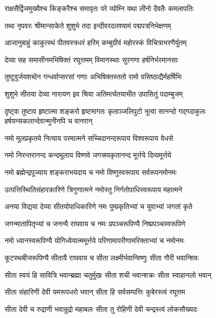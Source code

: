 \twolineshloka
{राक्षसैर्द्विजमुख्यैश्च किङ्करैश्च समावृतः}
{परे व्योम्नि यथा लीनो दैवतैः कमलापतिः}%

\twolineshloka
{तथा नृपवरः श्रीमान्साकेते शुशुभे तदा}
{इन्दीवरदलश्यामं पद्मपत्रनिभेक्षणम्}%

\twolineshloka
{आजानुबाहुं काकुत्स्थं पीतवस्त्रधरं हरिम्}
{कम्बुग्रीवं महोरस्कं विचित्राभरणैर्युतम्}%

\twolineshloka
{देव्या सह समासीनमभिषिक्तं रघूत्तमम्}
{विमानस्थाः सुरगणा हर्षनिर्भरमानसाः}%

\twolineshloka
{तुष्टुवुर्जयशब्देन गन्धर्वाप्सरसां गणाः}
{अभिषिक्तस्ततो रामो वसिष्ठाद्यैर्महर्षिभिः}%

\twolineshloka
{शुशुभे सीतया देव्या नारायण इव श्रिया}
{अतिमर्त्यतयाभीत उपासितुं पदाम्बुजम्}%

\threelineshloka
{दृष्ट्वा तुष्टाव हृष्टात्मा शङ्करो हृष्टमागतः}
{कृताञ्जलिपुटो भूत्वा सानन्दो गद्गदाकुलः}
{हर्षयन्सकलान्देवान्मुनीनपि च वानरान्}%


\twolineshloka
{नमो मूलप्रकृतये नित्याय परमात्मने}
{सच्चिदानन्दरूपाय विश्वरूपाय वेधसे}%

\twolineshloka
{नमो निरन्तरानन्द कन्दमूलाय विष्णवे}
{जगत्त्रयकृतानन्द मूर्त्तये दिव्यमूर्त्तये}%

\twolineshloka
{नमो ब्रह्मेन्द्रपूज्याय शङ्कराभयदाय च}
{नमो विष्णुस्वरूपाय सर्वरूपनमोनमः}%

\twolineshloka
{उत्पत्तिस्थितिसंहारकारिणे त्रिगुणात्मने}
{नमोस्तु निर्गतोपाधिस्वरूपाय महात्मने}%

\twolineshloka
{अनया विद्यया देव्या सीतयोपाधिकारिणे}
{नमः पुम्प्रकृतिभ्यां च युवाभ्यां जगतां कृते}%

\twolineshloka
{जगन्मातापितृभ्यां च जनन्यै राघवाय च}
{नमः प्रपञ्चरूपिण्यै निष्प्रपञ्चस्वरूपिणे}%

\twolineshloka
{नमो ध्यानस्वरूपिण्यै योगिध्येयात्ममूर्त्तये}
{परिणामापरीणामरिक्ताभ्यां च नमोनमः}%

\twolineshloka
{कूटस्थबीजरूपिण्यै सीतायै राघवाय च}
{सीता लक्ष्मीर्भवान्विष्णुः सीता गौरी भवान्शिवः}%

\twolineshloka
{सीता स्वयं हि सावित्रि भवान्ब्रह्मा चतुर्मुखः}
{सीता शची भवान्शक्रः सीता स्वाहानलो भवान्}%

\twolineshloka
{सीता संहारिणी देवी यमरूपधरो भवान्}
{सीता हि सर्वसम्पत्तिः कुबेरस्त्वं रघूत्तम}%

\twolineshloka
{सीता देवी च रुद्राणी भवान्रुद्रो महाबलः}
{सीता तु रोहिणी देवी चन्द्रस्त्वं लोकसौख्यदः}%

